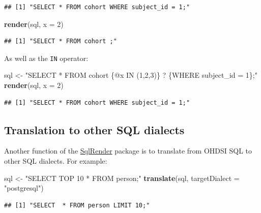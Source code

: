 \documentclass[11pt]{book}
\newenvironment{Shaded}{\begin{snugshade}}{\end{snugshade}}
\newcommand{\DataTypeTok}[1]{\textcolor[rgb]{0.13,0.29,0.53}{#1}}
\newcommand{\DecValTok}[1]{\textcolor[rgb]{0.00,0.00,0.81}{#1}}
\newcommand{\KeywordTok}[1]{\textcolor[rgb]{0.13,0.29,0.53}{\textbf{#1}}}
\newcommand{\NormalTok}[1]{#1}
\newcommand{\StringTok}[1]{\textcolor[rgb]{0.31,0.60,0.02}{#1}}
\theoremstyle{definition}
\theoremstyle{definition}
\theoremstyle{definition}
\theoremstyle{remark}
\begin{document}
\begin{verbatim}
## [1] "SELECT * FROM cohort WHERE subject_id = 1;"
\end{verbatim}

\begin{Shaded}
\begin{Highlighting}[]
\KeywordTok{render}\NormalTok{(sql, }\DataTypeTok{x =} \DecValTok{2}\NormalTok{)}
\end{Highlighting}
\end{Shaded}

\begin{verbatim}
## [1] "SELECT * FROM cohort ;"
\end{verbatim}

As well as the \texttt{IN} operator:

\begin{Shaded}
\begin{Highlighting}[]
\NormalTok{sql <-}\StringTok{ "SELECT * FROM cohort \{@x IN (1,2,3)\} ? \{WHERE subject_id = 1\};"}
\KeywordTok{render}\NormalTok{(sql, }\DataTypeTok{x =} \DecValTok{2}\NormalTok{)}
\end{Highlighting}
\end{Shaded}

\begin{verbatim}
## [1] "SELECT * FROM cohort WHERE subject_id = 1;"
\end{verbatim}

\hypertarget{translation-to-other-sql-dialects}{%
\subsection{Translation to other SQL dialects}\label{translation-to-other-sql-dialects}}

Another function of the \href{https://ohdsi.github.io/SqlRender/}{SqlRender} package is to translate from OHDSI SQL to other SQL dialects. For example:

\begin{Shaded}
\begin{Highlighting}[]
\NormalTok{sql <-}\StringTok{ "SELECT TOP 10 * FROM person;"}
\KeywordTok{translate}\NormalTok{(sql, }\DataTypeTok{targetDialect =} \StringTok{"postgresql"}\NormalTok{)}
\end{Highlighting}
\end{Shaded}

\begin{verbatim}
## [1] "SELECT  * FROM person LIMIT 10;"
\end{verbatim}
\end{document}
